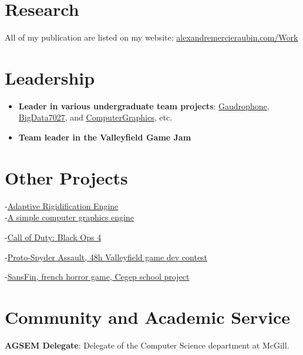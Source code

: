 \documentclass[10pt]{article} %
\begin{document}
\section{Research}
All of my publication are listed on my website: \href{https://alexandremercieraubin.com/Work}{alexandremercieraubin.com/Work}


\section{Leadership}
\begin{itemize}
\item \textbf{Leader in various undergraduate team projects}: \href{https://github.com/AlexandreMercierAubin/Gaudrophone}{Gaudrophone}, \href{https://github.com/AlexandreMercierAubin/BigData7027}{BigData7027}, and \href{https://github.com/AlexandreMercierAubin/ComputerGraphics}{ComputerGraphics}, etc. \\ 
\item \textbf{Team leader in the Valleyfield Game Jam}
\end{itemize}

\section{Other Projects}

{
-\href{https://github.com/AlexandreMercierAubin/AdaptiveRigidification2022}{Adaptive Rigidification Engine}\\
-\href{https://github.com/AlexandreMercierAubin/ComputerGraphics}{A simple computer graphics engine}\\

}

{
-\href{https://www.callofduty.com/ca/en/blackops4}{Call of Duty: Black Ops 4}

-\href{https://youtu.be/qJjy8b0kuSY}{Proto-Spyder Assault, 48h Valleyfield game dev contest}

-\href{https://youtu.be/s6vr07Nt1IY}{SansFin, french horror game, Cegep school project}
}

\section{Community and Academic Service}
\textbf{AGSEM Delegate}: Delegate of the Computer Science department at McGill.
\end{document}
